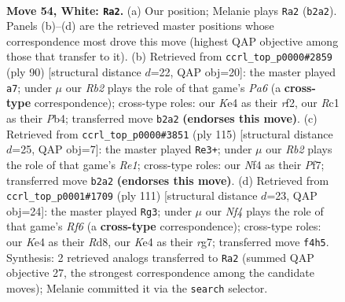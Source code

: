 \documentclass[11pt]{article}
\begin{document}
\clearpage

\begin{figure}[p]\centering
\begin{subfigure}{0.46\textwidth}\centering
\resizebox{\linewidth}{!}{%
\newchessgame
\chessboard[
  setfen={3r1k2/5p2/7r/p7/3pKN2/1P6/1R5P/2R5 w - - 2 54},
  showmover=false,
  pgfstyle=straightmove, color=movearrow, markmove={b2-a2}
]}
\caption{}
\end{subfigure}\hfill
\begin{subfigure}{0.46\textwidth}\centering
\resizebox{\linewidth}{!}{%
\newchessgame
\chessboard[
  setfen={8/5pk1/P1p1n3/8/1P5R/2NK1P2/5r1p/8 w - - 4 46},
  showmover=false,
  pgfstyle=straightmove, color=movearrow, markmove={a6-a7}
]}
\caption{}
\end{subfigure}
\\[4pt]
\begin{subfigure}{0.46\textwidth}\centering
\resizebox{\linewidth}{!}{%
\newchessgame
\chessboard[
  setfen={4r1k1/5p2/p1R2P2/8/1P5R/1K6/8/5r2 b - - 6 58},
  showmover=false,
  pgfstyle=straightmove, color=movearrow, markmove={e8-e3}
]}
\caption{}
\end{subfigure}\hfill
\begin{subfigure}{0.46\textwidth}\centering
\resizebox{\linewidth}{!}{%
\newchessgame
\chessboard[
  setfen={3r4/2RP2Rp/p7/3P1k2/5p2/5r2/8/2K5 b - - 2 56},
  showmover=false,
  pgfstyle=straightmove, color=movearrow, markmove={f3-g3}
]}
\caption{}
\end{subfigure}
\caption{\textbf{Move 54, White: \texttt{Ra2}.} (a) Our position; Melanie plays \texttt{Ra2} (\texttt{b2a2}). Panels (b)--(d) are the retrieved master positions whose correspondence most drove this move (highest QAP objective among those that transfer to it). (b) Retrieved from \texttt{ccrl\_top\_p0000\#2859} (ply 90) [structural distance $d$=22, QAP obj=20]: the master played \texttt{a7}; under $\mu$ our \emph{Rb2} plays the role of that game's \emph{Pa6} (a \textbf{cross-type} correspondence); cross-type roles: our \emph{K}e4 as their \emph{r}f2, our \emph{R}c1 as their \emph{P}b4; transferred move \texttt{b2a2} \textbf{(endorses this move)}. (c) Retrieved from \texttt{ccrl\_top\_p0000\#3851} (ply 115) [structural distance $d$=25, QAP obj=7]: the master played \texttt{Re3+}; under $\mu$ our \emph{Rb2} plays the role of that game's \emph{Re1}; cross-type roles: our \emph{N}f4 as their \emph{P}f7; transferred move \texttt{b2a2} \textbf{(endorses this move)}. (d) Retrieved from \texttt{ccrl\_top\_p0001\#1709} (ply 111) [structural distance $d$=23, QAP obj=24]: the master played \texttt{Rg3}; under $\mu$ our \emph{Nf4} plays the role of that game's \emph{Rf6} (a \textbf{cross-type} correspondence); cross-type roles: our \emph{K}e4 as their \emph{R}d8, our \emph{K}e4 as their \emph{r}g7; transferred move \texttt{f4h5}. Synthesis: 2 retrieved analogs transferred to \texttt{Ra2} (summed QAP objective 27, the strongest correspondence among the candidate moves); Melanie committed it via the \texttt{search} selector.}
\label{fig:thought-m106}
\end{figure}
\end{document}
